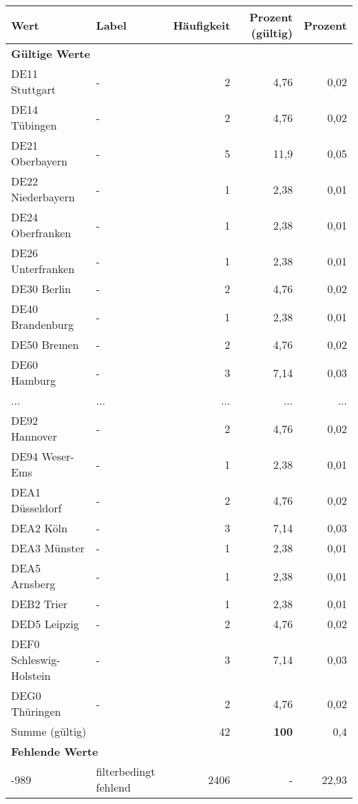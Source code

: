      \begin{longtable}{Xlrrr}
     \toprule
     \textbf{Wert} & \textbf{Label} & \textbf{Häufigkeit} & \textbf{Prozent (gültig)} & \textbf{Prozent} \\
     \endhead
     \midrule
     \multicolumn{5}{l}{\textbf{Gültige Werte}}\\
        \multicolumn{1}{X}{DE11 Stuttgart} & - & 2 & 4,76 & 0,02 \\
        \multicolumn{1}{X}{DE14 Tübingen} & - & 2 & 4,76 & 0,02 \\
        \multicolumn{1}{X}{DE21 Oberbayern} & - & 5 & 11,9 & 0,05 \\
        \multicolumn{1}{X}{DE22 Niederbayern} & - & 1 & 2,38 & 0,01 \\
        \multicolumn{1}{X}{DE24 Oberfranken} & - & 1 & 2,38 & 0,01 \\
        \multicolumn{1}{X}{DE26 Unterfranken} & - & 1 & 2,38 & 0,01 \\
        \multicolumn{1}{X}{DE30 Berlin} & - & 2 & 4,76 & 0,02 \\
        \multicolumn{1}{X}{DE40 Brandenburg} & - & 1 & 2,38 & 0,01 \\
        \multicolumn{1}{X}{DE50 Bremen} & - & 2 & 4,76 & 0,02 \\
        \multicolumn{1}{X}{DE60 Hamburg} & - & 3 & 7,14 & 0,03 \\
       ... & ... & ... & ... & ... \\
        \multicolumn{1}{X}{DE92 Hannover} & - & 2 & 4,76 & 0,02 \\
        \multicolumn{1}{X}{DE94 Weser-Ems} & - & 1 & 2,38 & 0,01 \\
        \multicolumn{1}{X}{DEA1 Düsseldorf} & - & 2 & 4,76 & 0,02 \\
        \multicolumn{1}{X}{DEA2 Köln} & - & 3 & 7,14 & 0,03 \\
        \multicolumn{1}{X}{DEA3 Münster} & - & 1 & 2,38 & 0,01 \\
        \multicolumn{1}{X}{DEA5 Arnsberg} & - & 1 & 2,38 & 0,01 \\
        \multicolumn{1}{X}{DEB2 Trier} & - & 1 & 2,38 & 0,01 \\
        \multicolumn{1}{X}{DED5 Leipzig} & - & 2 & 4,76 & 0,02 \\
        \multicolumn{1}{X}{DEF0 Schleswig-Holstein} & - & 3 & 7,14 & 0,03 \\
        \multicolumn{1}{X}{DEG0 Thüringen} & - & 2 & 4,76 & 0,02 \\
     \midrule
      \multicolumn{2}{l}{Summe (gültig)} & 42 &
      \textbf{100} &
         0,4 \\
     \multicolumn{5}{l}{\textbf{Fehlende Werte}}\\
       -989 & filterbedingt fehlend & 2406 & - & 22,93 \\


\end{longtable}
